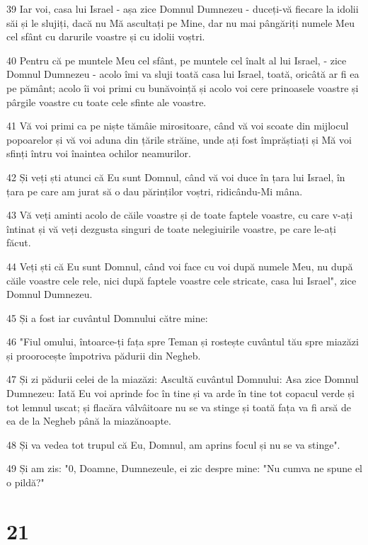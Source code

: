 \par 39 Iar voi, casa lui Israel - așa zice Domnul Dumnezeu - duceți-vă fiecare la idolii săi și le slujiți, dacă nu Mă ascultați pe Mine, dar nu mai pângăriți numele Meu cel sfânt cu darurile voastre și cu idolii voștri.
\par 40 Pentru că pe muntele Meu cel sfânt, pe muntele cel înalt al lui Israel, - zice Domnul Dumnezeu - acolo îmi va sluji toată casa lui Israel, toată, oricâtă ar fi ea pe pământ; acolo îi voi primi cu bunăvoință și acolo voi cere prinoasele voastre și pârgile voastre cu toate cele sfinte ale voastre.
\par 41 Vă voi primi ca pe niște tămâie mirositoare, când vă voi scoate din mijlocul popoarelor și vă voi aduna din țările străine, unde ați fost împrăștiați și Mă voi sfinți întru voi înaintea ochilor neamurilor.
\par 42 Și veți ști atunci că Eu sunt Domnul, când vă voi duce în țara lui Israel, în țara pe care am jurat să o dau părinților voștri, ridicându-Mi mâna.
\par 43 Vă veți aminti acolo de căile voastre și de toate faptele voastre, cu care v-ați întinat și vă veți dezgusta singuri de toate nelegiuirile voastre, pe care le-ați făcut.
\par 44 Veți ști că Eu sunt Domnul, când voi face cu voi după numele Meu, nu după căile voastre cele rele, nici după faptele voastre cele stricate, casa lui Israel", zice Domnul Dumnezeu.
\par 45 Și a fost iar cuvântul Domnului către mine:
\par 46 "Fiul omului, întoarce-ți fața spre Teman și rostește cuvântul tău spre miazăzi și proorocește împotriva pădurii din Negheb.
\par 47 Și zi pădurii celei de la miazăzi: Ascultă cuvântul Domnului: Asa zice Domnul Dumnezeu: Iată Eu voi aprinde foc în tine și va arde în tine tot copacul verde și tot lemnul uscat; și flacăra vâlvâitoare nu se va stinge și toată fața va fi arsă de ea de la Negheb până la miazănoapte.
\par 48 Și va vedea tot trupul că Eu, Domnul, am aprins focul și nu se va stinge".
\par 49 Și am zis: "0, Doamne, Dumnezeule, ei zic despre mine: "Nu cumva ne spune el o pildă?"

\chapter{21}

